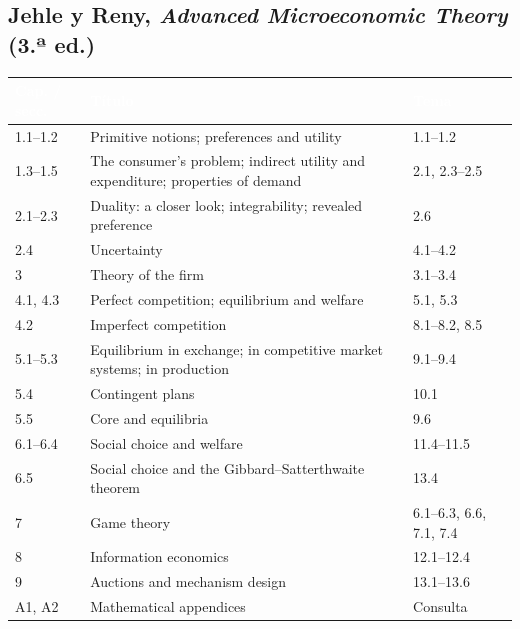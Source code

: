 \documentclass[11pt,a4paper]{article}
\newcommand{\cab}[1]{\textcolor{white}{\sffamily\bfseries #1}}
\newcommand{\filasalternas}{\rowcolors{2}{white}{tonoPalido}}
\begin{document}
\subsection*{Jehle y Reny, \emph{Advanced Microeconomic Theory} (3.ª ed.)}
{\small\filasalternas
\noindent\begin{tabularx}{\textwidth}{lXl}
\toprule
\rowcolor{tonoOscuro}\cab{Cap. / secc.} & \cab{Título} & \cab{Tema} \\
\midrule
1.1--1.2 & Primitive notions; preferences and utility & 1.1--1.2 \\
1.3--1.5 & The consumer's problem; indirect utility and expenditure; properties of demand & 2.1, 2.3--2.5 \\
2.1--2.3 & Duality: a closer look; integrability; revealed preference & 2.6 \\
2.4 & Uncertainty & 4.1--4.2 \\
3 & Theory of the firm & 3.1--3.4 \\
4.1, 4.3 & Perfect competition; equilibrium and welfare & 5.1, 5.3 \\
4.2 & Imperfect competition & 8.1--8.2, 8.5 \\
5.1--5.3 & Equilibrium in exchange; in competitive market systems; in production & 9.1--9.4 \\
5.4 & Contingent plans & 10.1 \\
5.5 & Core and equilibria & 9.6 \\
6.1--6.4 & Social choice and welfare & 11.4--11.5 \\
6.5 & Social choice and the Gibbard--Satterthwaite theorem & 13.4 \\
7 & Game theory & 6.1--6.3, 6.6, 7.1, 7.4 \\
8 & Information economics & 12.1--12.4 \\
9 & Auctions and mechanism design & 13.1--13.6 \\
A1, A2 & Mathematical appendices & Consulta \\
\bottomrule
\end{tabularx}
}
\end{document}

